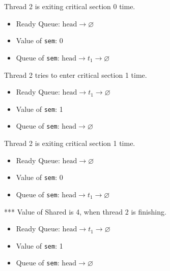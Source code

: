 \documentclass[11pt]{article}
\begin{document}
\begin{question}
    \begin{subquestion}
        Thread 2 is exiting critical section 0 time.

    \begin{itemize}
        \item{
            Ready Queue: $\text{head}\longrightarrow\varnothing$
        } \item{
            Value of {\tt sem}: 0
        } \item{
            Queue of {\tt sem}: $\text{head}\longrightarrow t_{1}\longrightarrow\varnothing$
        }
    \end{itemize}
    \end{subquestion}

    \begin{subquestion}
        Thread 2 tries to enter critical section 1 time.

    \begin{itemize}
        \item{
            Ready Queue: $\text{head}\longrightarrow t_{1}\longrightarrow\varnothing$
        } \item{
            Value of {\tt sem}: 1
        } \item{
            Queue of {\tt sem}: $\text{head}\longrightarrow\varnothing$
        }
    \end{itemize}
    \end{subquestion}

    \begin{subquestion}
        Thread 2 is exiting critical section 1 time.

    \begin{itemize}
        \item{
            Ready Queue: $\text{head}\longrightarrow\varnothing$
        } \item{
            Value of {\tt sem}: 0
        } \item{
            Queue of {\tt sem}: $\text{head}\longrightarrow t_{1}\longrightarrow\varnothing$
        }
    \end{itemize}
    \end{subquestion}

    \begin{subquestion}
        *** Value of Shared is 4, when thread 2 is finishing.

    \begin{itemize}
        \item{
            Ready Queue: $\text{head}\longrightarrow t_{1}\longrightarrow\varnothing$
        } \item{
            Value of {\tt sem}: 1
        } \item{
            Queue of {\tt sem}: $\text{head}\longrightarrow\varnothing$
        }
    \end{itemize}
    \end{subquestion}


\end{question}
\end{document}
